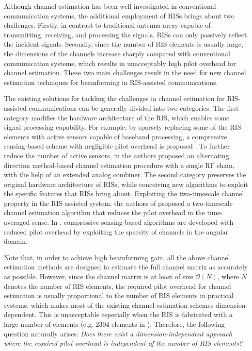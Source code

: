 \documentclass[conference,10pt,twocolumn]{IEEEtran}
\theoremstyle{nonumberplain}
\begin{document}
Although channel estimation has been well investigated in conventional communication systems, the additional employment of RISs brings about two challenges.
Firstly, in contrast to traditional antenna array capable of transmitting, receiving, and processing the signals, RISs can only passively reflect the incident signals.
Secondly, since the number of RIS elements is usually large, the dimensions of the channels increase sharply compared with conventional communication systems, which results in unacceptably high pilot overhead for channel estimation.
These two main challenges result in the need for new channel estimation techniques for beamforming in RIS-assisted communications.

The existing solutions for tackling the challenges in channel estimation for RIS-assisted communications can be generally divided into two categories.
The first category modifies the hardware architecture of the RIS, which enables some signal processing capability.
For example, by sparsely replacing some of the RIS elements with active sensors capable of baseband processing, a compressive sensing-based scheme with negligible pilot overhead is proposed \cite{taha2021enabling}. 
To further reduce the number of active sensors, in \cite{alexandropoulos2020hardware} the authors proposed an alternating direction method-based channel estimation procedure with a single \ac{RF} chain, with the help of an extended analog combiner.
The second category preserves the original hardware architecture of RISs, while conceiving new algorithms to exploit the specific features that RISs bring about.
Exploiting the two-timescale channel property in the RIS-assisted system, the authors of \cite{Huchen} proposed a two-timescale channel estimation algorithm that reduces the pilot overhead in the time-averaged sense.
In \cite{wang2020compressed}, compressive sensing-based algorithms are developed with reduced pilot overhead by exploiting the sparsity of channels in the angular domain.

Note that, in order to achieve high beamforming gain, all the above channel estimation methods are designed to estimate the full channel matrix as accurately as possible. 
However, since the channel matrix is at least of size $\mathcal{O}(N)$, where $N$ denotes the number of RIS elements, the required pilot overhead for channel estimation is usually proportional to the number of RIS elements \cite{taha2021enabling,alexandropoulos2020hardware,vlachos2019wideband,nguyen2021hybrid,Huchen,wang2020compressed,wang2020channel,kundu2021channel} in practical systems, which makes most of the existing channel estimation schemes dimension-dependent. 
This is unacceptable especially when the RIS is fabricated with a large number of elements (e.g. 2304 elements in \cite{yangfan2020coding}). 
Therefore, the following question naturally arises: {\it Does there exist a dimension-independent approach where the required pilot overhead is independent of the number of RIS elements?}
\end{document}
